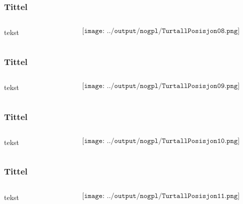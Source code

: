 \documentclass[aspectratio=169,xcolor=dvipsnames]{beamer}
\begin{document}
\begin{frame}
	\frametitle{Tittel}
	\begin{columns}
		\begin{column}{0.5\textwidth}
tekst
			
		\end{column}

		\begin{column}{0.5\textwidth}
	$$\texttt{[image: ../output/nogpl/TurtallPosisjon08.png]}$$
		\end{column}
	\end{columns}
\end{frame}

\begin{frame}
	\frametitle{Tittel}
	\begin{columns}
		\begin{column}{0.5\textwidth}
tekst
			
		\end{column}

		\begin{column}{0.5\textwidth}
	$$\texttt{[image: ../output/nogpl/TurtallPosisjon09.png]}$$
		\end{column}
	\end{columns}
\end{frame}

\begin{frame}
	\frametitle{Tittel}
	\begin{columns}
		\begin{column}{0.5\textwidth}
tekst
			
		\end{column}

		\begin{column}{0.5\textwidth}
	$$\texttt{[image: ../output/nogpl/TurtallPosisjon10.png]}$$
		\end{column}
	\end{columns}
\end{frame}

\begin{frame}
	\frametitle{Tittel}
	\begin{columns}
		\begin{column}{0.5\textwidth}
tekst
			
		\end{column}

		\begin{column}{0.5\textwidth}
	$$\texttt{[image: ../output/nogpl/TurtallPosisjon11.png]}$$
		\end{column}
	\end{columns}
\end{frame}
\end{document}
